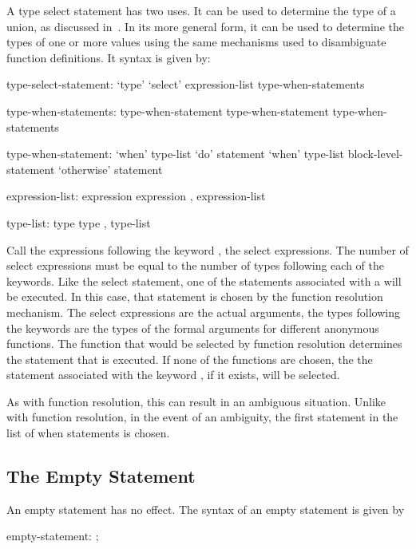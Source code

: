 A type select statement has two uses.  It can be used to determine the
type of a union, as discussed
in~.  In its more general
form, it can be used to determine the types of one or more values
using the same mechanisms used to disambiguate function definitions.
It syntax is given by:
\begin{syntax}
type-select-statement:
  `type' `select' expression-list { type-when-statements }

type-when-statements:
  type-when-statement
  type-when-statement type-when-statements

type-when-statement:
  `when' type-list `do' statement
  `when' type-list block-level-statement
  `otherwise' statement

expression-list:
  expression
  expression , expression-list

type-list:
  type
  type , type-list
\end{syntax}

Call the expressions following the keyword , the select
expressions.  The number of select expressions must be equal to the
number of types following each of the  keywords.  Like the
select statement, one of the statements associated with a 
will be executed.  In this case, that statement is chosen by the
function resolution mechanism.  The select expressions are the actual
arguments, the types following the  keywords are the types
of the formal arguments for different anonymous functions.  The
function that would be selected by function resolution determines the
statement that is executed.  If none of the functions are chosen, the
the statement associated with the keyword , if it
exists, will be selected.

As with function resolution, this can result in an ambiguous
situation.  Unlike with function resolution, in the event of an
ambiguity, the first statement in the list of when statements is
chosen.

\subsection{The Empty Statement}
\label{The_Empty_Statement}

An empty statement has no effect.  The syntax of an empty statement is
given by
\begin{syntax}
empty-statement:
  ;
\end{syntax}
